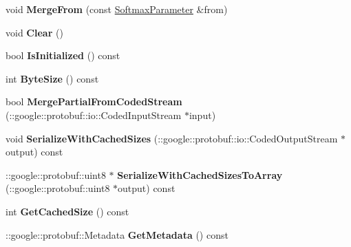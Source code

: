 \begin{DoxyCompactItemize}
\item 
\mbox{\label{classcaffe_1_1_softmax_parameter_a7818feca3923c69fdc3d4a858bae83eb}} 
void {\bfseries Merge\+From} (const \mbox{\hyperlink{classcaffe_1_1_softmax_parameter}{Softmax\+Parameter}} \&from)
\item 
\mbox{\label{classcaffe_1_1_softmax_parameter_afc10c708f8b8ced4b8073e8d8a9727c0}} 
void {\bfseries Clear} ()
\item 
\mbox{\label{classcaffe_1_1_softmax_parameter_afc25b2687b3ce876c6eb09545673196d}} 
bool {\bfseries Is\+Initialized} () const
\item 
\mbox{\label{classcaffe_1_1_softmax_parameter_a9d3f1766c856b3401684955e170a72ff}} 
int {\bfseries Byte\+Size} () const
\item 
\mbox{\label{classcaffe_1_1_softmax_parameter_a4babb1d019f772b910f45fbb3549c7f6}} 
bool {\bfseries Merge\+Partial\+From\+Coded\+Stream} (\+::google\+::protobuf\+::io\+::\+Coded\+Input\+Stream $\ast$input)
\item 
\mbox{\label{classcaffe_1_1_softmax_parameter_a0cc7c4a29da69430daf0cb18ce6e5897}} 
void {\bfseries Serialize\+With\+Cached\+Sizes} (\+::google\+::protobuf\+::io\+::\+Coded\+Output\+Stream $\ast$output) const
\item 
\mbox{\label{classcaffe_1_1_softmax_parameter_a983c84a7c3b26ed5601b3e1cc5d34915}} 
\+::google\+::protobuf\+::uint8 $\ast$ {\bfseries Serialize\+With\+Cached\+Sizes\+To\+Array} (\+::google\+::protobuf\+::uint8 $\ast$output) const
\item 
\mbox{\label{classcaffe_1_1_softmax_parameter_aa7ef703fcc8e6fdba1e7a2cb8e1900eb}} 
int {\bfseries Get\+Cached\+Size} () const
\item 
\mbox{\label{classcaffe_1_1_softmax_parameter_ade90ed5a2ca0158052e471c065c1c9c6}} 
\+::google\+::protobuf\+::\+Metadata {\bfseries Get\+Metadata} () const

\end{DoxyCompactItemize}

